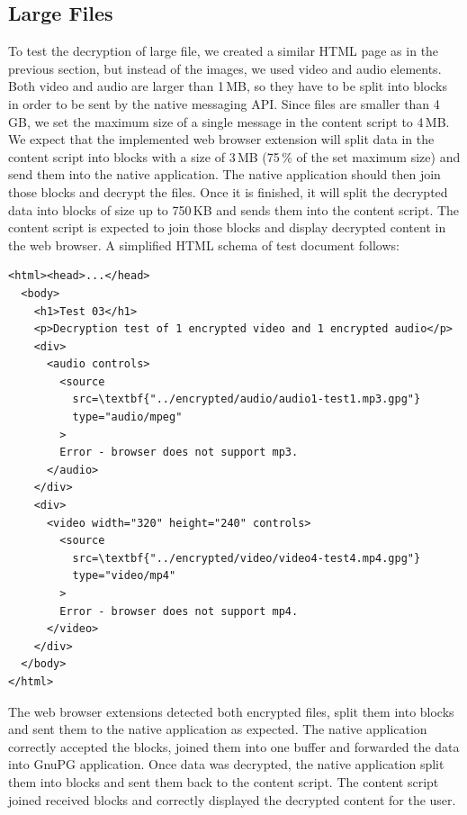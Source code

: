 \subsection{Large Files}
To test the decryption of large file, we created a similar HTML page as in the previous section, but instead of the images, we used video and audio elements. Both video and audio are larger than 1\,MB, so they have to be split into blocks in order to be sent by the native messaging API. Since files are smaller than 4\,GB, we set the maximum size of a single message in the content script to 4\,MB. We expect that the implemented web browser extension will split data in the content script into blocks with a size of 3\,MB (75\,\% of the set maximum size) and send them into the native application. The native application should then join those blocks and decrypt the files. Once it is finished, it will split the decrypted data into blocks of size up to 750\,KB and sends them into the content script. The content script is expected to join those blocks and display decrypted content in the web browser. A simplified HTML schema of test document follows:

\begin{Verbatim}[commandchars=\\\{\},codes={\catcode`$=3\catcode`_=8},samepage=false,frame=single]
<html><head>...</head>
  <body>
    <h1>Test 03</h1>
    <p>Decryption test of 1 encrypted video and 1 encrypted audio</p>
    <div>
      <audio controls>
        <source
          src=\textbf{"../encrypted/audio/audio1-test1.mp3.gpg"}
          type="audio/mpeg"
        >
        Error - browser does not support mp3.
      </audio>
    </div>
    <div>
      <video width="320" height="240" controls>
        <source
          src=\textbf{"../encrypted/video/video4-test4.mp4.gpg"}
          type="video/mp4"
        >
        Error - browser does not support mp4.
      </video>
    </div>
  </body>
</html>
\end{Verbatim}

The web browser extensions detected both encrypted files, split them into blocks and sent them to the native application as expected. The native application correctly accepted the blocks, joined them into one buffer and forwarded the data into GnuPG application. Once data was decrypted, the native application split them into blocks and sent them back to the content script. The content script joined received blocks and correctly displayed the decrypted content for the user.

